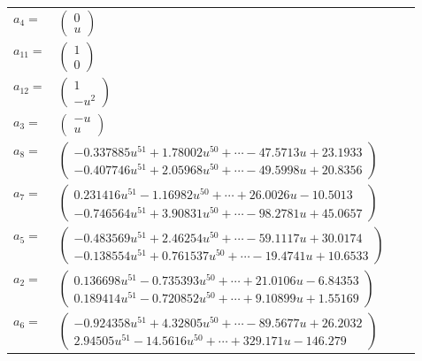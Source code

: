 \documentclass[1p]{elsarticle_modified}
\theoremstyle{definition}
\begin{document}
\begin{tabular}{m{7pt} m{180pt} m{7pt} m{180pt} }
\flushright $a_{4}=$&$\begin{pmatrix}0\\u\end{pmatrix}$ \\
\flushright $a_{11}=$&$\begin{pmatrix}1\\0\end{pmatrix}$ \\
\flushright $a_{12}=$&$\begin{pmatrix}1\\- u^2\end{pmatrix}$ \\
\flushright $a_{3}=$&$\begin{pmatrix}- u\\u\end{pmatrix}$ \\
\flushright $a_{8}=$&$\begin{pmatrix}-0.337885 u^{51}+1.78002 u^{50}+\cdots-47.5713 u+23.1933\\-0.407746 u^{51}+2.05968 u^{50}+\cdots-49.5998 u+20.8356\end{pmatrix}$ \\
\flushright $a_{7}=$&$\begin{pmatrix}0.231416 u^{51}-1.16982 u^{50}+\cdots+26.0026 u-10.5013\\-0.746564 u^{51}+3.90831 u^{50}+\cdots-98.2781 u+45.0657\end{pmatrix}$ \\
\flushright $a_{5}=$&$\begin{pmatrix}-0.483569 u^{51}+2.46254 u^{50}+\cdots-59.1117 u+30.0174\\-0.138554 u^{51}+0.761537 u^{50}+\cdots-19.4741 u+10.6533\end{pmatrix}$ \\
\flushright $a_{2}=$&$\begin{pmatrix}0.136698 u^{51}-0.735393 u^{50}+\cdots+21.0106 u-6.84353\\0.189414 u^{51}-0.720852 u^{50}+\cdots+9.10899 u+1.55169\end{pmatrix}$ \\
\flushright $a_{6}=$&$\begin{pmatrix}-0.924358 u^{51}+4.32805 u^{50}+\cdots-89.5677 u+26.2032\\2.94505 u^{51}-14.5616 u^{50}+\cdots+329.171 u-146.279\end{pmatrix}$ \\

\end{tabular}
\end{document}
